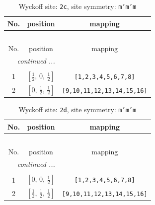 \documentclass[fleqn,8pt]{jsarticle}
\begin{document}
\renewcommand{\arraystretch}{1.2}
\begin{longtable}{ccc}
\caption{Wyckoff site: {\tt 2c}, site symmetry: {\tt m'm'm}}
 \\
 \hline \hline
No. & position & mapping \\ \hline \endfirsthead

\multicolumn{2}{l}{\tablename\ \thetable{}} \\
 \hline \hline
No. & position & mapping \\ \hline \endhead

 \hline \hline
\multicolumn{2}{r}{\footnotesize\it continued ...} \\ \endfoot

 \hline \hline
\multicolumn{2}{r}{} \\ \endlastfoot

1 & $\left[ \frac{1}{2},\, 0,\, \frac{1}{2} \right]$ & {\tt [1,2,3,4,5,6,7,8]} \\ \hline
2 & $\left[ 0,\, \frac{1}{2},\, \frac{1}{2} \right]$ & {\tt [9,10,11,12,13,14,15,16]} \\
\end{longtable}
\renewcommand{\arraystretch}{1.2}
\begin{longtable}{ccc}
\caption{Wyckoff site: {\tt 2d}, site symmetry: {\tt m'm'm}}
 \\
 \hline \hline
No. & position & mapping \\ \hline \endfirsthead

\multicolumn{2}{l}{\tablename\ \thetable{}} \\
 \hline \hline
No. & position & mapping \\ \hline \endhead

 \hline \hline
\multicolumn{2}{r}{\footnotesize\it continued ...} \\ \endfoot

 \hline \hline
\multicolumn{2}{r}{} \\ \endlastfoot

1 & $\left[ 0,\, 0,\, \frac{1}{2} \right]$ & {\tt [1,2,3,4,5,6,7,8]} \\ \hline
2 & $\left[ \frac{1}{2},\, \frac{1}{2},\, \frac{1}{2} \right]$ & {\tt [9,10,11,12,13,14,15,16]} \\
\end{longtable}
\renewcommand{\arraystretch}{1.2}
\end{document}
